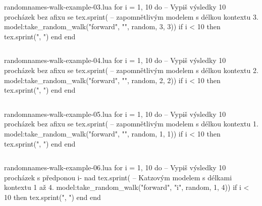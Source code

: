 \documentclass{csbulletin}
\let\exampleoutput\emph
\newcommand\myinputminted[3][]{%
  \inputminted[#1]{#2}{#3}%
}
\newcommand\myinputminted[3][]{%
  \inputminted[#1]{#2}{code-placeholder.#2}%
}
\begin{document}
\noindent
\exampleoutput{}

\begin{filecontents}{randomnames-walk-example-03.lua}
for i = 1, 10 do -- Vypiš výsledky 10 procházek bez afixu se
  tex.sprint(    -- zapomnětlivým modelem s délkou kontextu 3.
    model:take_random_walk("forward", "", random, 3, 3))
  if i < 10 then tex.sprint(", ") end
end
\end{filecontents}
\myinputminted[linenos=false]{lua}{randomnames-walk-example-03.lua}

\noindent
\exampleoutput{}

\begin{filecontents}{randomnames-walk-example-04.lua}
for i = 1, 10 do -- Vypiš výsledky 10 procházek bez afixu se
  tex.sprint(    -- zapomnětlivým modelem s délkou kontextu 2.
    model:take_random_walk("forward", "", random, 2, 2))
  if i < 10 then tex.sprint(", ") end
end
\end{filecontents}
\myinputminted[linenos=false]{lua}{randomnames-walk-example-04.lua}

\noindent
\exampleoutput{}

\begin{filecontents}{randomnames-walk-example-05.lua}
for i = 1, 10 do -- Vypiš výsledky 10 procházek bez afixu se
  tex.sprint(    -- zapomnětlivým modelem s délkou kontextu 1.
    model:take_random_walk("forward", "", random, 1, 1))
  if i < 10 then tex.sprint(", ") end
end
\end{filecontents}
\myinputminted[linenos=false]{lua}{randomnames-walk-example-05.lua}

\noindent
\exampleoutput{}

\begin{filecontents}{randomnames-walk-example-06.lua}
for i = 1, 10 do -- Vypiš výsledky 10 procházek s předponou i- nad
  tex.sprint(    -- Katzovým modelem s délkami kontextu 1 až 4.
    model:take_random_walk("forward", "i", random, 1, 4))
  if i < 10 then tex.sprint(", ") end
end
\end{filecontents}
\myinputminted[linenos=false]{lua}{randomnames-walk-example-06.lua}
\end{document}
